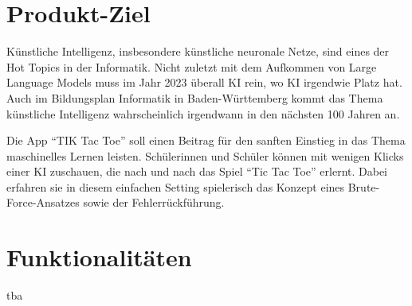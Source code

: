 \documentclass[titlepage]{scrartcl}
\title{\TicTacToe}
\subtitle{Product Backlog}
\date{Stand: \today}
\author{Jonas, Luis, Leonid}
\newcommand{\TicTacToe}{TI\reflectbox K Tac Toe}
\begin{document}
\maketitle

%

\section{Produkt-Ziel}%
Künstliche Intelligenz, insbesondere künstliche neuronale Netze, sind eines der Hot Topics in der Informatik.
Nicht zuletzt mit dem Aufkommen von Large Language Models muss im Jahr 2023 überall KI rein, wo KI irgendwie Platz hat.
Auch im Bildungsplan Informatik in Baden-Württemberg kommt das Thema künstliche Intelligenz wahrscheinlich irgendwann in den nächsten 100 Jahren an.

Die App "`\TicTacToe"' soll einen Beitrag für den sanften Einstieg in das Thema maschinelles Lernen leisten.
Schülerinnen und Schüler können mit wenigen Klicks einer KI zuschauen, die nach und nach das Spiel "`Tic Tac Toe"' erlernt.
Dabei erfahren sie in diesem einfachen Setting spielerisch das Konzept eines Brute-Force-Ansatzes sowie der Fehlerrückführung.

\section{Funktionalitäten}%
tba
\end{document}
